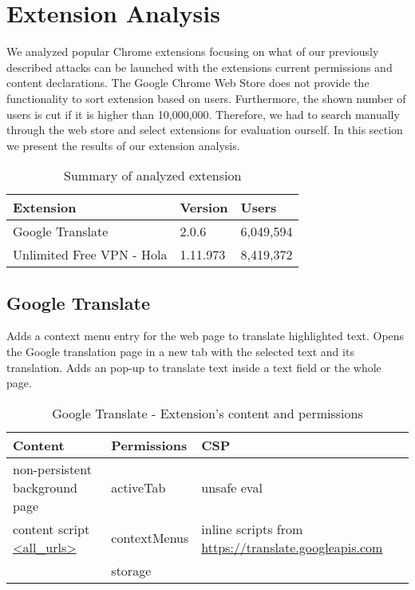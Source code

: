 
\section{Extension Analysis}

We analyzed popular Chrome extensions focusing on what of our previously described attacks can be launched with the extensions current permissions and content declarations. The Google Chrome Web Store does not provide the functionality to sort extension based on users. Furthermore, the shown number of users is cut if it is higher than 10,000,000. Therefore, we had to search manually through the web store and select extensions for evaluation ourself. In this section we present the results of our extension analysis. 

\begin{table}
	\centering
	\begin{tabular}{|l|l|l|} \hline
		\textbf{Extension} & \textbf{Version} & \textbf{Users} \\ \hline
		Google Translate & 2.0.6 & 6,049,594 \\ 
		Unlimited Free VPN - Hola & 1.11.973 & 8,419,372 \\ \hline
	\end{tabular}
	\caption{Summary of analyzed extension}
\end{table}


\subsection{Google Translate}
Adds a context menu entry for the web page to translate highlighted text. Opens the Google translation page in a new tab with the selected text and its translation. Adds an pop-up to translate text inside a text field or the whole page. \\

\begin{table}[h]
	\centering
	\begin{tabular}{|l|l|l|} \hline
		\textbf{Content} & \textbf{Permissions} & \textbf{CSP} \\ \hline
		non-persistent background page & activeTab & unsafe eval\\
		content script \url{<all_urls>} & contextMenus & inline scripts from \url{https://translate.googleapis.com} \\
		& storage & \\ \hline
	\end{tabular}
	\caption{Google Translate - Extension's content and permissions}
\end{table}

